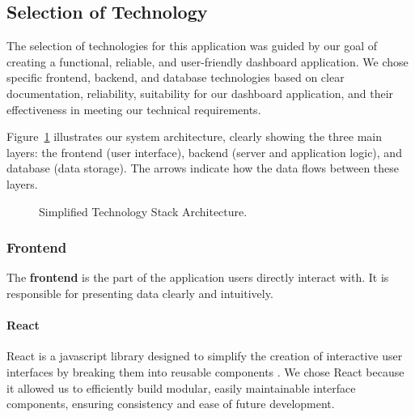 \subsection{Selection of Technology}
The selection of technologies for this application was guided by our goal of creating a functional, reliable, and user-friendly dashboard application. We chose specific frontend, backend, and database technologies based on clear documentation, reliability, suitability for our dashboard application, and their effectiveness in meeting our technical requirements. 

Figure~\ref{fig:tech_stack} illustrates our system architecture, clearly showing the three main layers: the frontend (user interface), backend (server and application logic), and database (data storage). The arrows indicate how the data flows between these layers.

\begin{figure}[H]
    \centering
    \caption{Simplified Technology Stack Architecture.}
    \label{fig:tech_stack}
\end{figure}

\subsubsection{Frontend}
The \textbf{\gls{frontend}} is the part of the application users directly interact with. It is responsible for presenting data clearly and intuitively.

\paragraph{React}
React is a \gls{javascript} library designed to simplify the creation of interactive user interfaces by breaking them into reusable components \autocite{react}. We chose React because it allowed us to efficiently build modular, easily maintainable interface components, ensuring consistency and ease of future development. 

